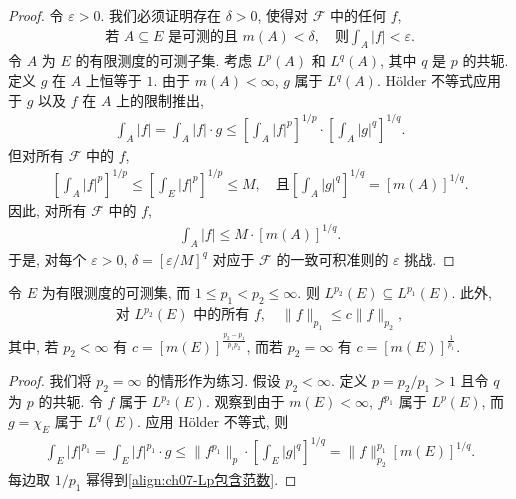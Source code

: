\documentclass[../../main.tex]{subfiles}
\begin{document}
\begin{proof}
令 $\varepsilon>0$. 我们必须证明存在 $\delta>0$, 使得对 $\mathcal{F}$ 中的任何 $f$,
\begin{align*}
\text{若 }A\subseteq E\text{ 是可测的且 }m(A)<\delta,\quad\text{则}\int_{A}|f|<\varepsilon.
\end{align*}
令 $A$ 为 $E$ 的有限测度的可测子集. 考虑 $L^{p}(A)$ 和 $L^{q}(A)$, 其中 $q$ 是 $p$ 的共轭. 定义 $g$ 在 $A$ 上恒等于 $1$. 由于 $m(A)<\infty$, $g$ 属于 $L^{q}(A)$. H\"older 不等式应用于 $g$ 以及 $f$ 在 $A$ 上的限制推出,
\begin{align*}
\int_{A}|f|=\int_{A}|f|\cdot g\leqslant\left[\int_{A}|f|^{p}\right]^{1/p}\cdot\left[\int_{A}|g|^{q}\right]^{1/q}.
\end{align*}
但对所有 $\mathcal{F}$ 中的 $f$,
\begin{align*}
\left[\int_{A}|f|^{p}\right]^{1/p}\leqslant\left[\int_{E}|f|^{p}\right]^{1/p}\leqslant M,\quad\text{且}\left[\int_{A}|g|^{q}\right]^{1/q}=[m(A)]^{1/q}.
\end{align*}
因此, 对所有 $\mathcal{F}$ 中的 $f$,
\begin{align*}
\int_{A}|f|\leqslant M\cdot[m(A)]^{1/q}.
\end{align*}
于是, 对每个 $\varepsilon>0$, $\delta=[\varepsilon/M]^{q}$ 对应于 $\mathcal{F}$ 的一致可积准则的 $\varepsilon$ 挑战.
\end{proof}

\begin{corollary}\label{corollary:ch07-Lp包含}
令 $E$ 为有限测度的可测集, 而 $1\leqslant p_{1}<p_{2}\leqslant\infty$. 则 $L^{p_{2}}(E)\subseteq L^{p_{1}}(E)$. 此外,
\begin{align}
\text{对 }L^{p_{2}}(E)\text{ 中的所有 }f,\quad\|f\|_{p_{1}}\leqslant c\|f\|_{p_{2}},\label{align:ch07-Lp包含范数}
\end{align}
其中, 若 $p_{2}<\infty$ 有 $c=[m(E)]^{\frac{p_{2}-p_{1}}{p_{1}p_{2}}}$, 而若 $p_{2}=\infty$ 有 $c=[m(E)]^{\frac{1}{p_{1}}}$.
\end{corollary}

\begin{proof}
我们将 $p_{2}=\infty$ 的情形作为练习. 假设 $p_{2}<\infty$. 定义 $p=p_{2}/p_{1}>1$ 且令 $q$ 为 $p$ 的共轭. 令 $f$ 属于 $L^{p_{2}}(E)$. 观察到由于 $m(E)<\infty$, $f^{p_{1}}$ 属于 $L^{p}(E)$, 而 $g=\chi_{E}$ 属于 $L^{q}(E)$. 应用 H\"older 不等式, 则
\begin{align*}
\int_{E}|f|^{p_{1}}=\int_{E}|f|^{p_{1}}\cdot g\leqslant\|f^{p_{1}}\|_{p}\cdot\left[\int_{E}|g|^{q}\right]^{1/q}=\|f\|_{p_{2}}^{p_{1}}[m(E)]^{1/q}.
\end{align*}
每边取 $1/p_{1}$ 幂得到\eqref{align:ch07-Lp包含范数}.
\end{proof}
\end{document}

